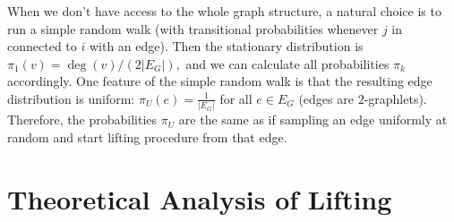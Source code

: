 	When we don't have access to the whole graph structure, a natural choice is to run a simple random walk (with transitional probabilities  whenever $j$ in connected to $i$ with an edge).
	Then the stationary distribution is $\pi_1(v) = \deg(v) / (2|E_G|),$ and we can calculate all probabilities $\pi_k$ accordingly.
	One feature of the simple random walk is that the resulting edge distribution is uniform: $\pi_U(e) = \frac{1}{|E_G|}$ for all $e\in E_G$ (edges are $2$-graphlets). 
	Therefore, the probabilities $\pi_U$ are the same as if sampling an edge uniformly at random and start lifting procedure from that edge.
	

\section{Theoretical Analysis of Lifting}

